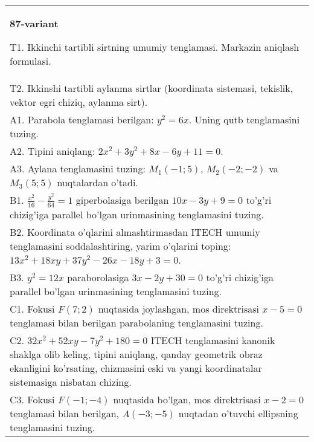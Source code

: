 \documentclass{article}
\begin{document}
\begin{tabular}{m{17cm}}
\textbf{87-variant}
\newline

T1. Ikkinchi tartibli sirtning umumiy tenglamasi. Markazin aniqlash formulasi.\\

T2. Ikkinshi tartibli aylanma sirtlar (koordinata sistemasi, tekislik, vektor egri chiziq, aylanma sirt).\\

A1. Parabola tenglamasi berilgan: $y^2=6x$. Uning qutb tenglamasini tuzing.\\

A2. Tipini aniqlang: $2x^{2}+3y^{2}+8x-6y+11=0$.\\

A3. Aylana tenglamasini tuzing: $M_1(-1;5)$, $M_2(-2;-2)$ va $M_3(5;5)$ nuqtalardan o'tadi.\\

B1. $\frac{x^{2}}{16} - \frac{y^{2}}{64} = 1$ giperbolasiga berilgan $10x - 3y + 9 = 0$ to'g'ri chizig'iga parallel bo'lgan urinmasining tenglamasini tuzing.  \\

B2. Koordinata o'qlarini almashtirmasdan ITECH umumiy tenglamasini soddalashtiring, yarim o'qlarini toping: $13x^{2} + 18xy + 37y^{2} - 26x - 18y + 3 = 0$.  \\

B3. $y^{2} = 12x$ paraborolasiga $3x - 2y + 30 = 0$ to'g'ri chizig'iga parallel bo'lgan urinmasining tenglamasini tuzing.  \\

C1. Fokusi $F(7;2)$ nuqtasida joylashgan, mos direktrisasi $x - 5 = 0$ tenglamasi bilan berilgan parabolaning tenglamasini tuzing.  \\

C2. $32x^{2} + 52xy - 7y^{2} + 180 = 0$ ITECH tenglamasini kanonik shaklga olib keling, tipini aniqlang, qanday geometrik obraz ekanligini ko'rsating, chizmasini eski va yangi koordinatalar sistemasiga nisbatan chizing.  \\

C3. Fokusi $F( - 1; - 4)$ nuqtasida bo'lgan, mos direktrisasi $x - 2 = 0$ tenglamasi bilan berilgan, $A( - 3; - 5)$ nuqtadan o'tuvchi ellipsning tenglamasini tuzing.  \\

\end{tabular}
\vspace{1cm}
\end{document}
